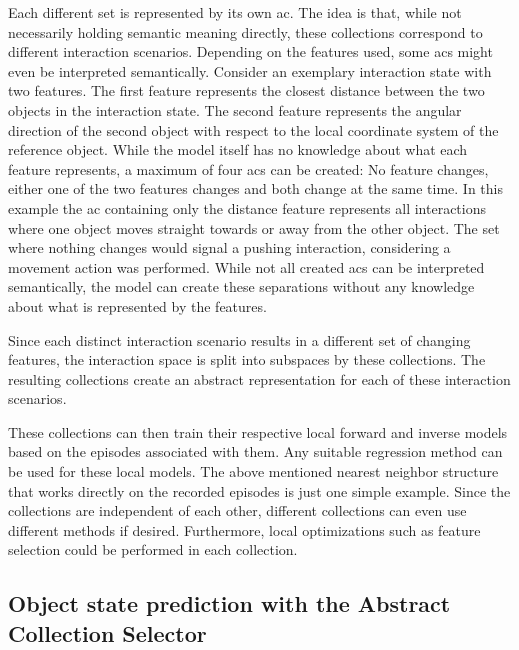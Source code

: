 Each different set is represented by its own \acrlong{ac}. The 
idea is that, while not necessarily holding semantic meaning directly, these collections correspond to different interaction scenarios. Depending on the features used, some \glspl{ac} might even be interpreted semantically.
Consider an exemplary interaction state with two features. The first feature represents the closest distance between the two objects in the interaction state. The second feature represents the angular direction of the second object with respect to the local coordinate system of the reference object. While the model itself has no knowledge about what each feature represents, a maximum of four \glspl{ac} can be created: No feature changes, either one of the two features changes and both change at the same time. In this example the \gls{ac} containing only the distance feature represents all interactions where one object moves straight towards or away from the other object. The set where nothing changes would signal a pushing interaction, considering a movement action was performed. While not all created \glspl{ac} can be interpreted semantically, the model can create these separations without any knowledge about what is represented by the features.

Since each distinct interaction scenario results in a different set of changing features, the interaction space is split into subspaces by these collections. The resulting collections create an abstract representation for each of these interaction scenarios. 

These collections can then train their respective local forward and inverse models based on the episodes associated with them. Any suitable regression method can be used for these local models. The above mentioned nearest neighbor structure that works directly on the recorded episodes is just one simple example. Since the collections are independent of each other, different collections can even use different methods if desired. Furthermore, local optimizations such as feature selection could be performed in each collection. 

\subsection{Object state prediction with the Abstract Collection Selector \label{sec:pairPrediction}}

